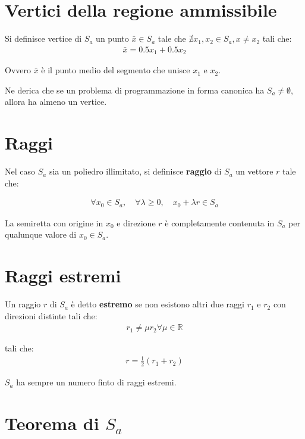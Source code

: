 \section{Vertici della regione ammissibile}

Si definisce vertice di $S_a$ un punto $\bar{x} \in S_a$ tale che $\nexists x_1, x_2 \in S_a, x \neq x_2$ tali che:
\begin{align}
	\bar{x} = 0.5 x_1 + 0.5 x_2
\end{align}

Ovvero $\bar{x}$ è il punto medio del segmento che unisce $x_1$ e $x_2$.



Ne derica che se un problema di programmazione in forma canonica ha $S_a\neq \emptyset$, allora ha almeno un vertice.


\section{Raggi}
Nel caso $S_a$ sia un poliedro illimitato, si definisce \textbf{raggio} di $S_a$ un vettore $r$ tale che:

\begin{align}
	\forall x_0 \in S_a, \quad \forall \lambda \geq 0, \quad x_0 + \lambda r \in S_a
\end{align}

La semiretta con origine in $x_0$ e direzione $r$ è completamente contenuta in $S_a$ per qualunque valore di $x_0 \in S_a$.



\section{Raggi estremi}
Un raggio $r$ di $S_a$ è detto \textbf{estremo} se non esistono altri due raggi $r_1$ e $r_2$ con direzioni distinte tali che:
\begin{align}
	r_1 \neq \mu r_2 \forall \mu \in \mathbb{R}
\end{align}

tali che:
\begin{align}
	r = \frac{1}{2} (r_1 + r_2)
\end{align}

$S_a$ ha sempre un numero finto di raggi estremi.



\section{Teorema di $S_a$}

